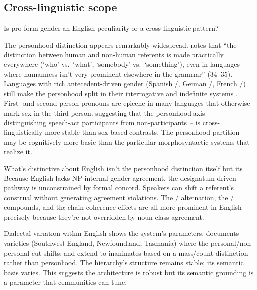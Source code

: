 \subsection{Cross-linguistic scope}
\label{sec:12:cross-linguistic}

Is pro-form gender an English peculiarity or a cross-linguistic pattern?

The personhood distinction appears remarkably widespread. \textcite{haspelmath1997} notes that \enquote{the distinction between human and non-human referents is made practically everywhere (\enquote{who} vs.\ \enquote{what}, \enquote{somebody} vs.\ \enquote{something}), even in languages where humanness isn't very prominent elsewhere in the grammar} (34--35). Languages with rich antecedent-driven gender (Spanish /, German /, French /) still make the personhood split in their interrogative and indefinite systems \autocite{corbett1991,dahl2000}. First- and second-person pronouns are epicene in many languages that otherwise mark sex in the third person, suggesting that the personhood axis~-- distinguishing speech-act participants from non-participants~-- is cross-linguistically more stable than sex-based contrasts. The personhood partition may be cognitively more basic than the particular morphosyntactic systems that realize it.

What's distinctive about English isn't the personhood distinction itself but its . Because English lacks NP-internal gender agreement, the designatum-driven pathway is unconstrained by formal concord. Speakers can shift a referent's construal without generating agreement violations. The / alternation, the / compounds, and the chain-coherence effects are all more prominent in English precisely because they're not overridden by noun-class agreement.

Dialectal variation within English shows the system's parameters. \textcite{siemund2008} documents varieties (Southwest England, Newfoundland, Tasmania) where the personal/non-personal cut shifts:  and  extend to inanimates based on a mass/count distinction rather than personhood. The hierarchy's structure remains stable; its semantic basis varies. This suggests the architecture is robust but its semantic grounding is a parameter that communities can tune.

